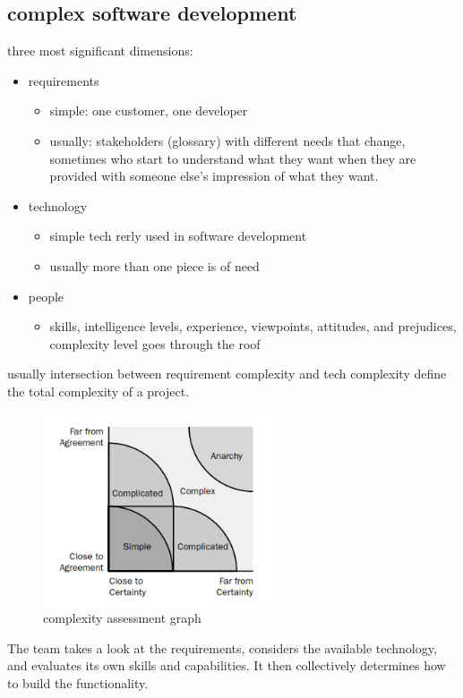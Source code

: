 \subsection{complex software development}

three most significant dimensions:  

\begin{itemize}
  \item requirements
  \begin{itemize}
    \item simple: one customer, one developer
    \item usually: stakeholders (glossary) with different needs that change, sometimes who start to understand what they want when they are
    provided with someone else’s impression of what they want.
  \end{itemize}
  \item technology
  \begin{itemize}
    \item simple tech rerly used in software development
    \item usually more than one piece is of need
  \end{itemize}
  \item people
  \begin{itemize}
    \item skills, intelligence levels, experience, viewpoints, attitudes, and prejudices, complexity level
    goes through the roof
  \end{itemize}
\end{itemize}

usually intersection between requirement complexity and tech complexity define the total complexity of a project. 

\begin{figure}[H]
  \centering
  \includegraphics[width=0.6\textwidth]{./figures/chapter_1/complexity_assessment_graph.PNG}
  \caption{complexity assessment graph}
  \label{fig:ch1-complexity_assessment_graph}
\end{figure}\bigskip

The team takes a look at the requirements, considers the available technology, and evaluates its own skills and capabilities. It then collectively determines how to build the functionality.



